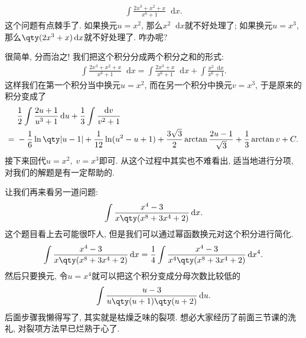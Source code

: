 \documentclass{ctexbook}
\newcommand*{\dif}{\mathop{}\!\mathrm{d}}
\begin{document}
{\begin{align*}
\int\frac{2x^{3}+x^{2}+x}{x^{6}+1}\dif{x}
.\end{align*}
这个问题有点棘手了. 如果换元$u=x^{2}$, 那么$x^{2}\dif{x}$就不好处理了; 如果换元$u=x^{3}$, 那么$\qty(2x^{3}+x)\dif{x}$就不好处理了. 咋办呢? \par
很简单, 分而治之! 我们把这个积分分成两个积分之和的形式: 
\begin{align*}
\int\frac{2x^{3}+x^{2}+x}{x^{6}+1}\dif{x}=\int\frac{2x^{3}+x}{x^{6}+1}\dif{x}+\int\frac{x^{2}\dif{x}}{x^{6}+1}
.\end{align*}
这样我们在第一个积分当中换元$u=x^{2}$, 而在另一个积分中换元$v=x^{3}$, 于是原来的积分变成了
\begin{align*}
{}&\frac{1}{2}\int\frac{2u+1}{u^{3}+1}\dif{u}+\frac{1}{3}\int\frac{\dif{v}}{v^{2}+1}\\
={}&-\frac{1}{6}\ln\qty|u-1|+\frac{1}{12}\ln(u^{2}-u+1)+\frac{3\sqrt{3}}{2}\arctan{\frac{2u-1}{\sqrt{3}}}+\frac{1}{3}\arctan{v}+C
.\end{align*}
接下来回代$u=x^{2},\;v=x^{3}$即可. 从这个过程中其实也不难看出, 适当地进行分项, 对我们的解题是有一定帮助的. \par
让我们再来看另一道问题: 
\begin{align*}
\int\frac{x^{4}-3}{x\qty(x^{8}+3x^{4}+2)}\dif{x}
.\end{align*}
这个题目看上去可能很吓人, 但是我们可以通过幂函数换元对这个积分进行简化. 
\begin{align*}
\int\frac{x^{4}-3}{x\qty(x^{8}+3x^{4}+2)}\dif{x}=\frac{1}{4}\int\frac{x^{4}-3}{x^{4}\qty(x^{8}+3x^{4}+2)}\dif{x^{4}}
.\end{align*}
然后只要换元, 令$u=x^{4}$就可以把这个积分变成分母次数比较低的
\begin{align*}
\int\frac{u-3}{u\qty(u+1)\qty(u+2)}\dif{u}
.\end{align*}
后面步骤我懒得写了, 其实就是枯燥乏味的裂项. 想必大家经历了前面三节课的洗礼, 对裂项方法早已烂熟于心了. \par
}
\end{document}
